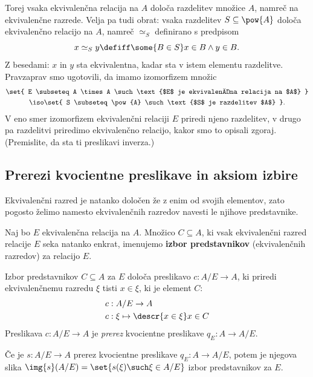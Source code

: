 Torej vsaka ekvivalenčna relacija na $A$ določa razdelitev množice $A$, namreč na
ekvivalenčne razrede. Velja pa tudi obrat: vsaka razdelitev $S \subseteq \pow{A}$ določa ekvivalenčno
relacijo na $A$, namreč $\simeq_S$ definirano s predpisom
\begin{equation*}
    x \simeq_S y \defiff \some{B \in S} x \in B \land y \in B.
\end{equation*}
%
Z besedami: $x$ in $y$ sta ekvivalentna, kadar sta v istem elementu razdelitve. Pravzaprav
smo ugotovili, da imamo izomorfizem množic
%
\begin{multline*}
  \set{ E \subseteq A \times A \such \text{$E$ je ekvivalenčna relacija na $A$} } \\
  \iso \set{ S \subseteq \pow{A} \such \text{$S$ je razdelitev $A$} }.
\end{multline*}
%
V eno smer izomorfizem ekvivalenčni relaciji $E$ priredi njeno razdelitev, v drugo pa razdelitvi priredimo ekvivalenčno
relacijo, kakor smo to opisali zgoraj. (Premislite, da sta ti preslikavi inverza.)


\subsection{Prerezi kvocientne preslikave in aksiom izbire}

Ekvivalenčni razred je natanko določen že z enim od svojih elementov, zato pogosto želimo
namesto ekvivalenčnih razredov navesti le njihove predstavnike.

\begin{definicija}
  Naj bo $E$ ekvivalenčna relacija na $A$. Množico $C \subseteq A$, ki vsak
  ekvivalenčni razred relacije $E$ seka natanko enkrat, imenujemo \textbf{izbor predstavnikov}
  (ekvivalenčnih razredov) za relacijo $E$.
\end{definicija}

Izbor predstavnikov $C \subseteq A$ za $E$ določa preslikavo $c : A/E \to A$, ki priredi
ekvivalenčnemu razredu $\xi$ tisti $x \in \xi$, ki je element $C$:
%
\begin{align*}
  c &: A/E \to A \\
  c &: \xi \mapsto \descr{x \in \xi} x \in C
\end{align*}
%
Preslikava $c : A/E \to A$ je \emph{prerez} kvocientne preslikave $q_E : A \to A/E$.

\begin{izjava}
  Če je $s : A/E \to A$ prerez kvocientne preslikave $q_E : A \to A/E$, potem je
  njegova slika $\img{s}(A/E) = \set{ s(\xi) \such \xi \in A/E }$ izbor predstavnikov za $E$.
\end{izjava}

